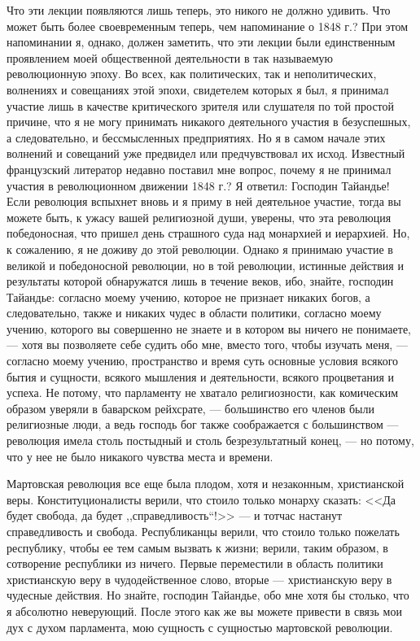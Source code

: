 \documentclass[12pt]{article}
\begin{document}
Что эти лекции появляются лишь теперь, это никого не должно удивить. Что может быть более своевременным теперь, чем напоминание о 1848 г.? При этом напоминании я, однако, должен заметить, что эти лекции были единственным проявлением моей общественной деятельности в так называемую революционную эпоху. Во всех, как политических, так и неполитических, волнениях и совещаниях этой эпохи, свидетелем которых я был, я принимал участие лишь в качестве критического зрителя или слушателя по той простой причине, что я не могу принимать никакого деятельного участия в безуспешных, а следовательно, и бессмысленных предприятиях. Но я в самом начале этих волнений и совещаний уже предвидел или предчувствовал их исход. Известный французский литератор недавно поставил мне вопрос, почему я не принимал участия в революционном движении 1848 г.? Я ответил: Господин Тайандье! Если революция вспыхнет вновь и я приму в ней деятельное участие, тогда вы можете быть, к ужасу вашей религиозной души, уверены, что эта революция победоносная, что пришел день страшного суда над монархией и иерархией. Но, к сожалению, я не доживу до этой революции. Однако я принимаю участие в великой и победоносной революции, но в той революции, истинные действия и результаты которой обнаружатся лишь в течение веков, ибо, знайте, господин Тайандье: согласно моему учению, которое не признает никаких богов, а следовательно, также и никаких чудес в области политики, согласно моему учению, которого вы совершенно не знаете и в котором вы ничего не понимаете, --- хотя вы позволяете себе судить обо мне, вместо того, чтобы изучать меня, --- согласно моему учению, пространство и время суть основные условия всякого бытия и сущности, всякого мышления и деятельности, всякого процветания и успеха. Не потому, что парламенту не хватало религиозности, как комическим образом уверяли в баварском рейхсрате, --- большинство его членов были религиозные люди, а ведь господь бог также соображается с большинством --- революция имела столь постыдный и столь безрезультатный конец, --- но потому, что у нее не было никакого чувства места и времени. 

Мартовская революция все еще была плодом, хотя и незаконным, христианской веры. Конституционалисты верили, что стоило только монарху сказать: <<Да будет свобода, да будет ,,справедливость``!>> --- и тотчас настанут справедливость и свобода. Республиканцы верили, что стоило только пожелать республику, чтобы ее тем самым вызвать к жизни; верили, таким образом, в сотворение республики из ничего. Первые переместили в область политики христианскую веру в чудодейственное слово, вторые --- христианскую веру в чудесные действия. Но знайте, господин Тайандье, обо мне хотя бы столько, что я абсолютно неверующий. После этого как же вы можете привести в связь мои дух с духом парламента, мою сущность с сущностью мартовской революции.
\end{document}
